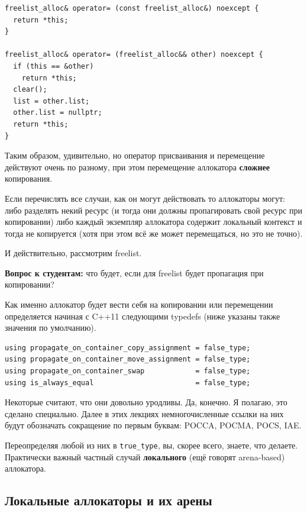 \documentclass[a4paper,12pt,oneside]{book}
\newif\ifanswers
\begin{document}
\begin{lstlisting}
freelist_alloc& operator= (const freelist_alloc&) noexcept {
  return *this;
}

freelist_alloc& operator= (freelist_alloc&& other) noexcept {
  if (this == &other)
    return *this;
  clear();
  list = other.list;
  other.list = nullptr;
  return *this;
}
\end{lstlisting}

Таким образом, удивительно, но оператор присваивания и перемещение действуют очень по разному, при этом перемещение аллокатора \textbf{сложнее} копирования. 

Если перечислять все случаи, как он могут действовать то аллокаторы могут: либо разделять некий ресурс (и тогда они должны пропагировать свой ресурс при копировании) либо каждый экземпляр аллокатора содержит локальный контекст и тогда не копируется (хотя при этом всё же может перемещаться, но это не точно).

И действительно, рассмотрим freelist.

\textbf{Вопрос к студентам:} что будет, если для freelist будет пропагация при копировании?

\ifanswers
Правильный ответ: голова freelist в этом случае может оказаться поделена между старым и новым элементами.
\fi

Как именно аллокатор будет вести себя на копировании или перемещении определяется начиная с C++11 следующими typedefs (ниже указаны также значения по умолчанию).

\begin{lstlisting}
using propagate_on_container_copy_assignment = false_type;
using propagate_on_container_move_assignment = false_type;
using propagate_on_container_swap            = false_type;
using is_always_equal                        = false_type;
\end{lstlisting}

Некоторые считают, что они довольно уродливы. Да, конечно. Я полагаю, это сделано специально. Далее в этих лекциях немногочисленные ссылки на них будут обозначать сокращение по первым буквам: POCCA, POCMA, POCS, IAE.

Переопределяя любой из них в \lstinline!true_type!, вы, скорее всего, знаете, что делаете. Практически важный частный случай \textbf{локального} (ещё говорят arena-based) аллокатора.

\subsection{Локальные аллокаторы и их арены}\label{sub:localloc}
\end{document}

